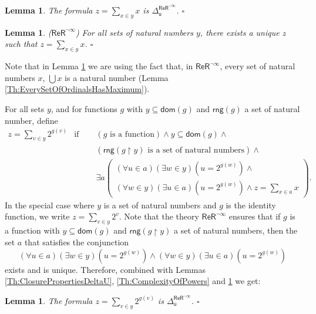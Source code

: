 \documentclass[11pt, a4paper]{article}
\newcounter{Prop1}
\newtheorem{lemma}[theorem]{Lemma}
\begin{document}
\begin{lemma} \label{Th:ComplexityOfSum} 
The formula $z= \sum_{x \in y} x$ is $\Delta_{\mathsf{u}}^{\mathsf{ReR}^{\neg \infty}}$. \hfill$\square$
\end{lemma}

\begin{lemma} \label{Th:UniquenessOfSum}
($\mathsf{ReR}^{\neg \infty}$) For all sets of natural numbers $y$, there exists a unique $z$ such that $z= \sum_{x\in y} x$. \hfill$\square$
\end{lemma}

Note that in Lemma \ref{Th:UniquenessOfSum} we are using the fact that, in $\mathsf{ReR}^{\neg \infty}$, every set of natural numbers $x$, $\bigcup x$ is a natural number (Lemma \ref{Th:EverySetOfOrdinalsHasMaximum}).

For all sets $y$, and for functions $g$ with $y \subseteq \mathsf{dom}(g)$ and $\mathsf{rng}(g)$ a set of natural number, define
\[
\begin{array}{lcl}
z= \sum_{v \in y} 2^{g(v)} &\textrm{if and only if}& (g \textrm{ is a function}) \land y \subseteq \mathsf{dom}(g) \land\\ 
&& (\mathsf{rng}(g \upharpoonright y) \textrm{ is a set of natural numbers}) \land\\
&&\exists a\left( \begin{array}{c}
(\forall u \in a)(\exists w \in y)(u= 2^{g(w)}) \land\\
(\forall w \in y)(\exists u \in a)(u=2^{g(w)}) \land z= \sum_{x \in a} x 
\end{array} \right).
\end{array}
\]
In the special case where $y$ is a set of natural numbers and $g$ is the identity function, we write $z= \sum_{v \in y} 2^v$. Note that the theory $\mathsf{ReR}^{\neg \infty}$ ensures that if $g$ is a function with $y \subseteq \mathsf{dom}(g)$ and $\mathsf{rng}(g \upharpoonright y)$ a set of natural numbers, then the set $a$ that satisfies the conjunction
\[
(\forall u \in a)(\exists w \in y)(u= 2^{g(w)}) \land (\forall w \in y)(\exists u \in a)(u=2^{g(w)})
\] 
exists and is unique. Therefore, combined with Lemmas \ref{Th:ClosurePropertiesDeltaU}, \ref{Th:ComplexityOfPowers} and \ref{Th:ComplexityOfSum} we get:

\begin{lemma} \label{Th:ComplexityOfPowerSum}
The formula $z= \sum_{v \in y} 2^{g(v)}$ is $\Delta_{\mathsf{u}}^{\mathsf{ReR}^{\neg \infty}}$. \hfill$\square$
\end{lemma}
\end{document}
